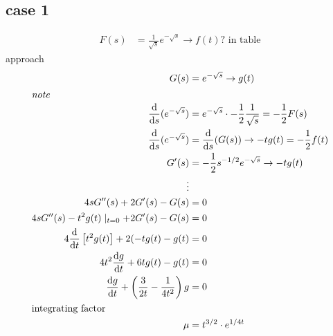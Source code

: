 \documentclass{article}
\begin{document}
\subsection*{case 1}
\begin{align*}
  F(s)&=\frac{1}{\sqrt{s}}e^{-\sqrt{s}}\to f(t)\text{? in table}
\end{align*}
approach
\begin{align*}
  G(s)&=e^{-\sqrt{s}}\to g(t)\\
  \intertext{\emph{note}}
  \frac{\mathrm{d}}{\mathrm{d}s}(e^{-\sqrt{s}})&=e^{-\sqrt{s}}\cdot-\frac{1}{2}\frac{1}{\sqrt{s}}=-\frac{1}{2}F(s)\\
  \frac{\mathrm{d}}{\mathrm{d}s}(e^{-\sqrt{s}})&=\frac{\mathrm{d}}{\mathrm{d}s}(G(s))\to -tg(t)=-\frac{1}{2}f(t)\\
  G'(s)&=-\frac{1}{2}s^{-1/2}e^{-\sqrt{s}}\to -tg(t)\\
  \vdots\\
  4sG''(s)+2G'(s)-G(s)&=0\\
  4sG''(s)-t^2g(t)\mid_{t=0}+2G'(s)-G(s)&=0\\
  4\frac{\mathrm{d}}{\mathrm{d}t}\left[t^2g(t)\right]+2(-tg(t)-g(t)&=0\\
  4t^2\frac{\mathrm{d}g}{\mathrm{d}t}+6tg(t)-g(t)&=0\\
  \frac{\mathrm{d}g}{\mathrm{d}t}+\left(\frac{3}{2t}-\frac{1}{4t^2}\right)g&=0\\
  \intertext{integrating factor}
  \mu &=t^{3/2}\cdot e^{1/4t}
\end{align*}
\end{document}
